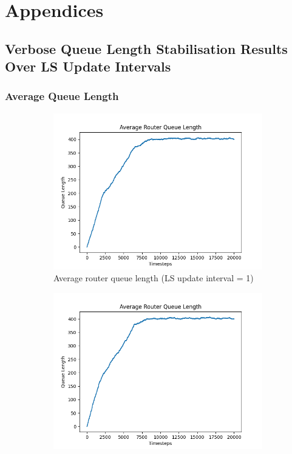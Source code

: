 \appendixpage
\appendix
\chapter*{Appendices}
\renewcommand{\thesection}{\Alph{section})}
\renewcommand{\thesubsection}{\Alph{section}.\arabic{subsection}}

\section{Verbose Queue Length Stabilisation Results Over LS Update Intervals}
\subsection{Average Queue Length}
    \begin{figure}[h]
        \centering
        \begin{subfigure}[b]{0.475\textwidth}
            \centering
            \includegraphics[width=\textwidth]{figs/appendix/average_ls=1.png}
            \caption[]{Average router queue length (LS update interval = 1)}
        \end{subfigure}
        \hfill
        \begin{subfigure}[b]{0.475\textwidth}
            \centering
            \includegraphics[width=\textwidth]{figs/appendix/average_ls=10.png}

\end{subfigure}
\end{figure}
